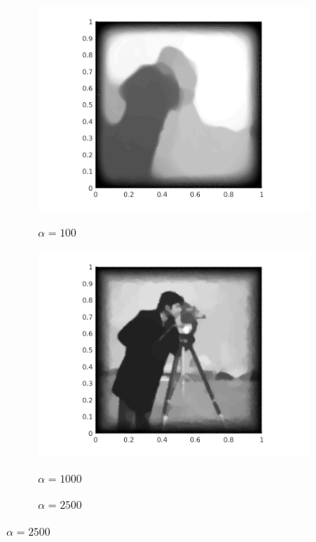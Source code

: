 \begin{figure}[!ht]
  \begin{subfigure}{.3\linewidth}
    \caption{$\alpha=100$}
    \includegraphics[trim = 60 20 60 20, clip, width=\linewidth]
      {pictures/introBeta/snr10/00100.png}
    \label{fig:snr10alpha100}
  \end{subfigure}
  \begin{subfigure}{.3\linewidth}
    \caption{$\alpha=1000$}
    \includegraphics[trim = 60 20 60 20, clip, width=\linewidth]
      {pictures/introBeta/snr10/01000.png}
    \label{fig:snr10alpha1000}
  \end{subfigure}
  \begin{subfigure}{.3\linewidth}
    \caption{$\alpha=2500$}

\end{subfigure}
\end{figure}
